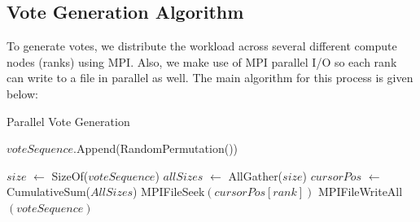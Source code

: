 \documentclass[final,5p,times,twocolumn,authoryear, 10pt]{elsarticle}
\begin{document}
\subsection{Vote Generation Algorithm}
\label{Vote Generation Algorithm}
To generate votes, we distribute the workload across several different compute
nodes (ranks) using MPI. Also, we make use of MPI parallel I/O so each rank can
write to a file in parallel as well. The main algorithm for this process is
given below:
\begin{algorithm}[H]
    \caption{Parallel Vote Generation}\label{alg:cap}
    \begin{algorithmic}[1]
        \State $voteSequence$.Append(RandomPermutation())
    \EndFor

    \State $size$ $\gets$ SizeOf($voteSequence$)
    \State $allSizes$ $\gets$ AllGather($size$) 
    \State $cursorPos$ $\gets$ CumulativeSum($AllSizes$)
    \State MPIFileSeek$(cursorPos[rank])$
    \State MPIFileWriteAll$(voteSequence)$
    \EndProcedure
    \end{algorithmic}
\end{algorithm}
\end{document}

